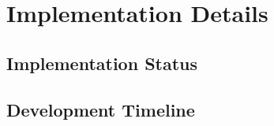 ﻿\chapter{Implementation Details}
\label{ch:progress}

\section{Implementation Status}
\label{sec:impl_status}


\section{Development Timeline}
\label{sec:timeline}

